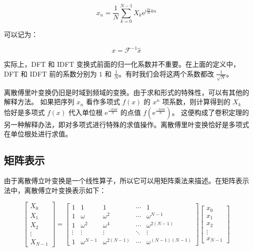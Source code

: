 \documentclass[12pt,a4paper]{article}
\begin{document}
\begin{equation}
x_n=\frac{1}{N}\sum_{k=0}^{N-1}X_k\mathrm{e}^{\mathrm{i}\frac{2\pi}{N}kn}
\end{equation}

可以记为：

\begin{equation}
x=\mathcal{F}^{-1}\hat{x}
\end{equation}

实际上，DFT 和 IDFT 变换式前面的归一化系数并不重要。在上面的定义中，DFT 和 IDFT 前的系数分别为 $1$ 和 $\frac {1}{N}$。有时我们会将这两个系数都改 $\frac{1}{{\sqrt{N}}}$。

离散傅里叶变换仍旧是时域到频域的变换。由于求和形式的特殊性，可以有其他的解释方法。
如果把序列 $x_n$ 看作多项式 $f(x)$ 的 $x^n$ 项系数，则计算得到的 $X_k$ 恰好是多项式 $f(x)$ 代入单位根 $\mathrm{e}^{\frac{-2\pi \mathrm{i}k}{N}}$ 的点值 $f(\mathrm{e}^{\frac{-2\pi \mathrm{i}k}{N}})$。
这便构成了卷积定理的另一种解释办法，即对多项式进行特殊的求值操作。离散傅里叶变换恰好是多项式在单位根处进行求值。
\subsection{矩阵表示}
由于离散傅立叶变换是一个线性算子，所以它可以用矩阵乘法来描述。在矩阵表示法中，离散傅立叶变换表示如下：

\begin{equation}
\begin{bmatrix}
    X_{0}  \\
    X_{1}  \\
    X_{2}  \\
    \vdots \\
    X_{N-1}
\end{bmatrix}
=
\begin{bmatrix}
    1      & 1            & 1               & \cdots & 1                   \\
    1      & \omega       & \omega^{2}      & \cdots & \omega^{N-1}        \\
    1      & \omega^{2}   & \omega^{4}      & \cdots & \omega^{2(N-1)}     \\
    \vdots & \vdots       & \vdots          & \ddots & \vdots              \\
    1      & \omega^{N-1} & \omega^{2(N-1)} & \cdots & \omega^{(N-1)(N-1)}
\end{bmatrix}
\begin{bmatrix}
    x_{0}  \\
    x_{1}  \\
    x_{2}  \\
    \vdots \\
    x_{N-1}
\end{bmatrix}
\end{equation}
\end{document}
